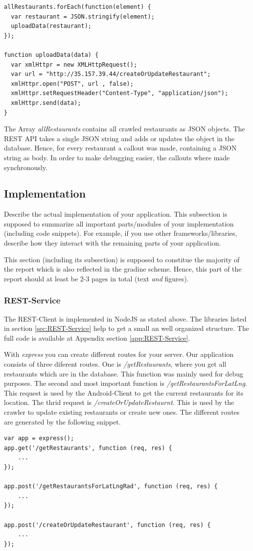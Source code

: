 \begin{lstlisting}
allRestaurants.forEach(function(element) {
  var restaurant = JSON.stringify(element);
  uploadData(restaurant);
});

function uploadData(data) {
  var xmlHttpr = new XMLHttpRequest();
  var url = "http://35.157.39.44/createOrUpdateRestaurant";
  xmlHttpr.open("POST", url , false);
  xmlHttpr.setRequestHeader("Content-Type", "application/json");
  xmlHttpr.send(data);
}
\end{lstlisting}

The Array \textit{allRestaurants} contains all crawled restaurants as JSON objects. The REST API takes a single JSON string and adds or updates the object in the database. Hence, for every restaurant a callout was made, containing a JSON string as body. In order to make debugging easier, the callouts where made synchronously.



\subsection{Implementation}

Describe the actual implementation of your application. This subsection is
supposed to summarize all important parts/modules of your implementation
(including code snippets). For example, if you use other frameworks/libraries,
describe how they interact with the remaining parts of your application.

This section (including its subsection) is supposed to constitue the majority
of the report which is also reflected in the gradine scheme. Hence, this part of
the report should at least be 2-3 pages in total (text \emph{and} figures).

\subsubsection{REST-Service}
The REST-Client is implemented in NodeJS as stated above. The libraries listed in section \ref{sec:REST-Service} help to get a small an well organized structure. The full code is available at Appendix section \ref{app:REST-Service}.

With \textit{express} you can create different routes for your server. Our application consists of three diferent routes. One is \textit{/getRestaurants}, where you get all restaurants which are in the database. This function was mainly used for debug purposes. The second and most important function is \textit{/getRestaurantsForLatLng}. This request is used by the Android-Client to get the current restaurants for its location. The thrid request is \textit{/createOrUpdateRestaurnt}. This is used by the crawler to update existing restaurants or create new ones. The different routes are generated by the following snippet.
\begin{lstlisting}
var app = express();
app.get('/getRestaurants', function (req, res) {
	...
});

app.post('/getRestaurantsForLatLngRad', function (req, res) {
	...
});

app.post('/createOrUpdateRestaurant', function (req, res) {
	...
});
\end{lstlisting}


